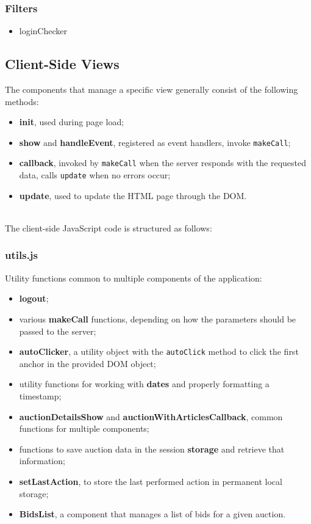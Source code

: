 \documentclass[12pt, a4paper, renqo, final]{amsart}
\begin{document}
				\subsubsection{Filters}
					\begin{itemize}
						\item loginChecker
					\end{itemize}

			\subsection{Client-Side Views}
				The components that manage a specific view generally consist of the following methods:
				\begin{itemize}
					\item \textbf{init}, used during page load;
					\item \textbf{show} and \textbf{handleEvent}, registered as event handlers, invoke \texttt{makeCall};
					\item \textbf{callback}, invoked by \texttt{makeCall} when the server responds with the requested data, calls \texttt{update} when no errors occur;
					\item \textbf{update}, used to update the HTML page through the DOM.
				\end{itemize}
				\phantom{.}\\
				The client-side JavaScript code is structured as follows:

				\subsubsection{utils.js}
					Utility functions common to multiple components of the application:
					\begin{itemize}
						\item \textbf{logout};
						\item various \textbf{makeCall} functions, depending on how the parameters should be passed to the server;
						\item \textbf{autoClicker}, a utility object with the \texttt{autoClick} method to click the first anchor in the provided DOM object;
						\item utility functions for working with \textbf{dates} and properly formatting a timestamp;
						\item \textbf{auctionDetailsShow} and \textbf{auctionWithArticlesCallback}, common functions for multiple components;
						\item functions to save auction data in the session \textbf{storage} and retrieve that information;
						\item \textbf{setLastAction}, to store the last performed action in permanent local storage;
						\item \textbf{BidsList}, a component that manages a list of bids for a given auction.
					\end{itemize}
\end{document}
